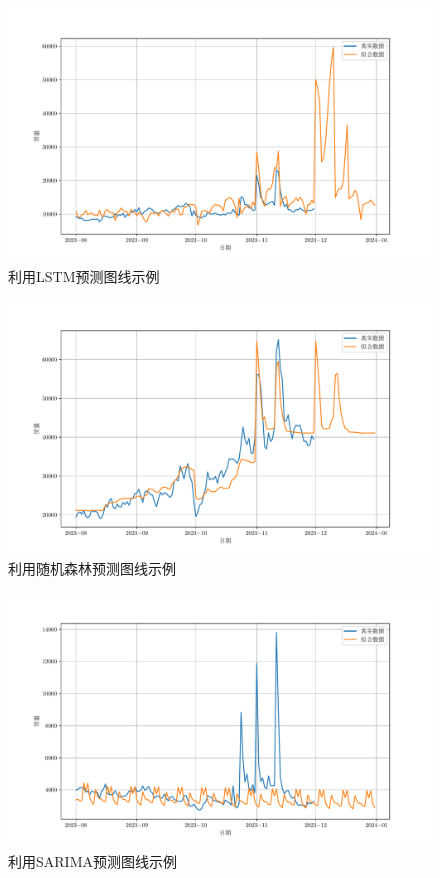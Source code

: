 \documentclass[UTF8,a4paper,10 pt]{article}%
\begin{document}
\begin{figure}[t]
	\centering
	\includegraphics*[width=0.8\linewidth]{images/LSTM_R.pdf}
	\caption{利用LSTM预测图线示例}
	\label{lstm}
\end{figure}
\begin{figure}[!ht]
	\centering
	\includegraphics*[width=0.8\linewidth]{images/pre_10.pdf}
	\caption{利用随机森林预测图线示例}
	\label{rf}
\end{figure}

\begin{figure}[!ht]
	\centering
	\includegraphics*[width=0.8\linewidth]{images/pre_55.pdf}
	\caption{利用SARIMA预测图线示例}
	\label{sarima}
\end{figure}
\end{document}
